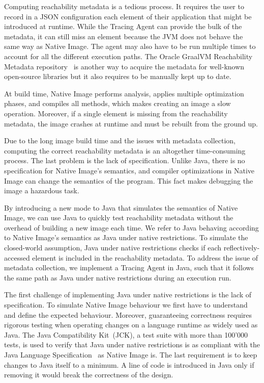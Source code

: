Computing reachability metadata is a tedious process. It requires the user to record in a JSON configuration each element of their application that might be introduced at runtime. While the Tracing Agent can provide the bulk of the metadata, it can still miss an element because the JVM does not behave the same way as Native Image. The agent may also have to be run multiple times to account for all the different execution paths. The Oracle GraalVM Reachability Metadata repository~\cite{noauthor_oraclegraalvm-reachability-metadata_2024} is another way to acquire the metadata for well-known open-source libraries but it also requires to be manually kept up to date.

At build time, Native Image performs analysis, applies multiple optimization phases, and compiles all methods, which makes creating an image a slow operation.
Moreover, if a single element is missing from the reachability metadata, the image crashes at runtime and must be rebuilt from the ground up. 

Due to the long image build time and the issues with metadata collection, computing the correct reachability metadata is an altogether time-consuming process. 
The last problem is the lack of specification. Unlike Java, there is no specification for Native Image's semantics, and compiler optimizations in Native Image can change the semantics of the program. This fact makes debugging the image a hazardous task.

By introducing a new mode to Java that simulates the semantics of Native Image, we can use Java to quickly test reachability metadata without the overhead of building a new image each time. We refer to Java behaving according to Native Image's semantics as Java under native restrictions.
To simulate the closed-world assumption, Java under native restrictions checks if each reflectively-accessed element is included in the reachability metadata. To address the issue of metadata collection, we implement a Tracing Agent in Java, such that it follows the same path as Java under native restrictions during an execution run.

The first challenge of implementing Java under native restrictions is the lack of specification. To simulate Native Image behaviour we first have to understand and define the expected behaviour. Moreover, guaranteeing correctness requires rigorous testing when operating changes on a language runtime as widely used as Java. The Java Compatibility Kit~(JCK), a test suite with more than 100'000 tests, is used to verify that Java under native restrictions is as compliant with the Java Language Specification~\cite{noauthor_java_nodate-2} as Native Image is.
The last requirement is to keep changes to Java itself to a minimum. A line of code is introduced in Java only if removing it would break the correctness of the design.

